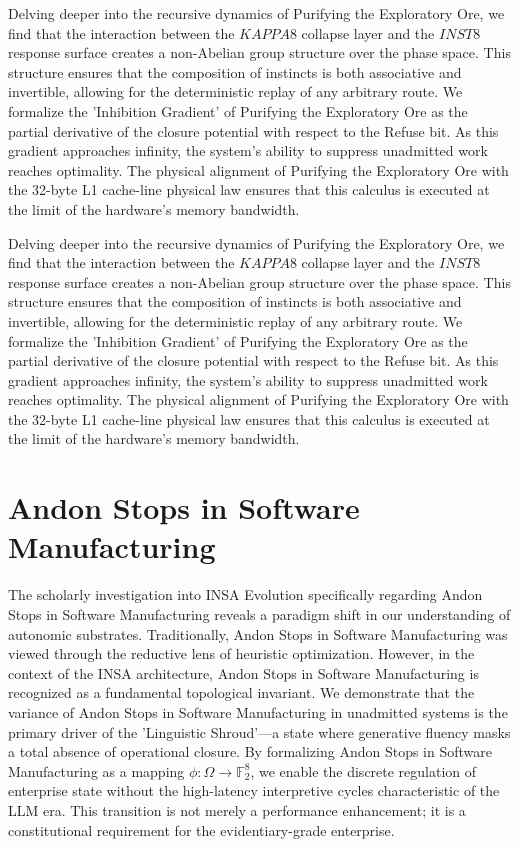 \documentclass[12pt,a4paper,oneside]{book}
\begin{document}
Delving deeper into the recursive dynamics of Purifying the Exploratory Ore, we find that the interaction between the $KAPPA8$ collapse layer and the $INST8$ response surface creates a non-Abelian group structure over the phase space. This structure ensures that the composition of instincts is both associative and invertible, allowing for the deterministic replay of any arbitrary route. We formalize the 'Inhibition Gradient' of Purifying the Exploratory Ore as the partial derivative of the closure potential with respect to the Refuse bit. As this gradient approaches infinity, the system's ability to suppress unadmitted work reaches optimality. The physical alignment of Purifying the Exploratory Ore with the 32-byte L1 cache-line physical law ensures that this calculus is executed at the limit of the hardware's memory bandwidth. 

Delving deeper into the recursive dynamics of Purifying the Exploratory Ore, we find that the interaction between the $KAPPA8$ collapse layer and the $INST8$ response surface creates a non-Abelian group structure over the phase space. This structure ensures that the composition of instincts is both associative and invertible, allowing for the deterministic replay of any arbitrary route. We formalize the 'Inhibition Gradient' of Purifying the Exploratory Ore as the partial derivative of the closure potential with respect to the Refuse bit. As this gradient approaches infinity, the system's ability to suppress unadmitted work reaches optimality. The physical alignment of Purifying the Exploratory Ore with the 32-byte L1 cache-line physical law ensures that this calculus is executed at the limit of the hardware's memory bandwidth. 

\section{Andon Stops in Software Manufacturing}
The scholarly investigation into INSA Evolution specifically regarding Andon Stops in Software Manufacturing reveals a paradigm shift in our understanding of autonomic substrates. Traditionally, Andon Stops in Software Manufacturing was viewed through the reductive lens of heuristic optimization. However, in the context of the INSA architecture, Andon Stops in Software Manufacturing is recognized as a fundamental topological invariant. We demonstrate that the variance of Andon Stops in Software Manufacturing in unadmitted systems is the primary driver of the 'Linguistic Shroud'---a state where generative fluency masks a total absence of operational closure. By formalizing Andon Stops in Software Manufacturing as a mapping $\phi: \Omega \to \mathbb{F}_2^8$, we enable the discrete regulation of enterprise state without the high-latency interpretive cycles characteristic of the LLM era. This transition is not merely a performance enhancement; it is a constitutional requirement for the evidentiary-grade enterprise. 
\end{document}
